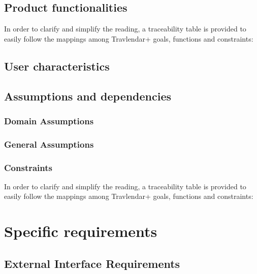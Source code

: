 \documentclass{article}
\begin{document}
\clearpage

\subsection{Product functionalities}

In order to clarify and simplify the reading, a traceability table is provided to easily follow the mappings among Travlendar+ goals, functions and constraints: \\

\clearpage

\subsection{User characteristics}



\subsection{Assumptions and dependencies}

\subsubsection{Domain Assumptions}


\subsubsection{General Assumptions}


\subsubsection{Constraints}

In order to clarify and simplify the reading, a traceability table is provided to easily follow the mappings among Travlendar+ goals, functions and constraints: \\


\clearpage
\section{Specific requirements}

\subsection{External Interface Requirements}
\end{document}

